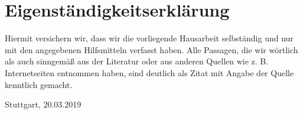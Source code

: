 

\clearpage
\section*{Eigenständigkeitserklärung}
\vspace*{2cm}
\begin{center}
	\begin{minipage}[t]{0.8\textwidth}
		Hiermit versichern wir, dass wir die vorliegende Hausarbeit selbständig und nur mit den angegebenen Hilfsmitteln verfasst haben. Alle Passagen, die wir wörtlich als auch sinngemäß aus der Literatur oder aus anderen Quellen wie z. B. Internetseiten entnommen haben, sind deutlich als Zitat mit Angabe der Quelle kenntlich gemacht.
		
		\vspace*{60mm}
		Stuttgart, 20.03.2019
	\end{minipage}
\end{center}





